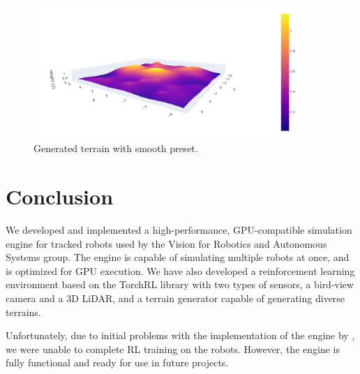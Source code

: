 \documentclass[a4paper,12pt]{article}
\begin{document}
\begin{figure}[H]
  \centering
  \includegraphics[width=0.9\textwidth]{fig/smooth_terrain.png}
  \caption{Generated terrain with smooth preset.}
\end{figure}
\section{Conclusion}
\label{sec:conclusion}

We developed and implemented a high-performance, GPU-compatible simulation engine for tracked robots used by the Vision for Robotics and Autonomous Systems group. The engine is capable of simulating multiple robots at once, and is optimized for GPU execution. We have also developed a reinforcement learning environment based on the TorchRL library with two types of sensors, a bird-view camera and a 3D LiDAR, and a terrain generator capable of generating diverse terrains.

Unfortunately, due to initial problems with the implementation of the engine by \citet{Agishev_2024}, we were unable to complete RL training on the robots. However, the engine is fully functional and ready for use in future projects.

\clearpage



\end{document}
